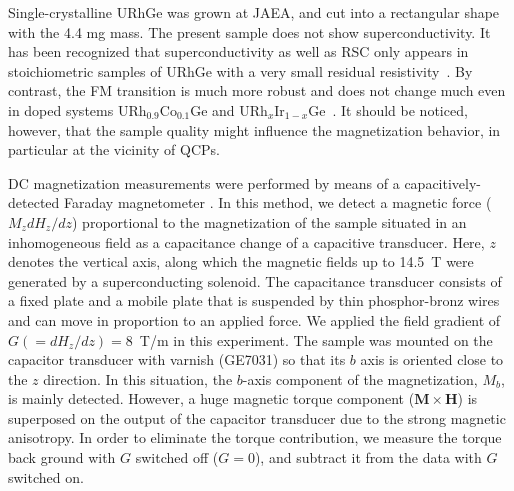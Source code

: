 \documentclass[twocolumn, aps, superscriptaddress, amsfonts,floatfix]{revtex4}%
\begin{document}

Single-crystalline URhGe was grown at JAEA, and cut into a rectangular shape with the 4.4 mg mass.
The present sample does not show superconductivity. It has been recognized that superconductivity as well as RSC only appears in stoichiometric samples of URhGe with a very small residual resistivity~\cite{doi:10.1143/JPSJ.77.094709}. 
 By contrast, the FM transition  is much more robust and does not change much even in doped systems  URh$_{0.9}$Co$_{0.1}$Ge and URh$_{x}$Ir$_{1-x}$Ge~\cite{tokunaga2015reentrant,PhysRevB.95.155138}. 
It should be noticed, however, that the sample quality might influence the magnetization behavior, in particular at the vicinity of QCPs.

DC magnetization  measurements were performed by means of a capacitively-detected Faraday magnetometer \cite{sakakibara1994faraday}.
 In this method, we detect a magnetic force ($M_{z}dH_z/dz$) proportional to the magnetization of the sample situated in an inhomogeneous field  as a capacitance change of a capacitive transducer. 
 Here, $z$ denotes the vertical axis, along which the magnetic fields up to 14.5~T were generated by a superconducting solenoid.
The capacitance transducer consists of a fixed plate and a mobile plate that is suspended by thin phosphor-bronz wires and can move  in proportion to an applied force.
We applied the field gradient of $G (=dH_z/dz) =8$~T/m in this experiment.
The sample was mounted on the capacitor transducer with varnish (GE7031) so that its $b$ axis is oriented close to the $z$ direction. 
In this situation, the $b$-axis component of the magnetization, $M_b$, is mainly detected. However, a huge magnetic torque component (${\bm M}\times {\bm H}$) is superposed on the output of the capacitor transducer due to the strong magnetic anisotropy. In order to eliminate the torque contribution, we measure the torque back ground with $G$ switched off ($G=0$), and subtract it from the data with $G$ switched on. 
\end{document}
